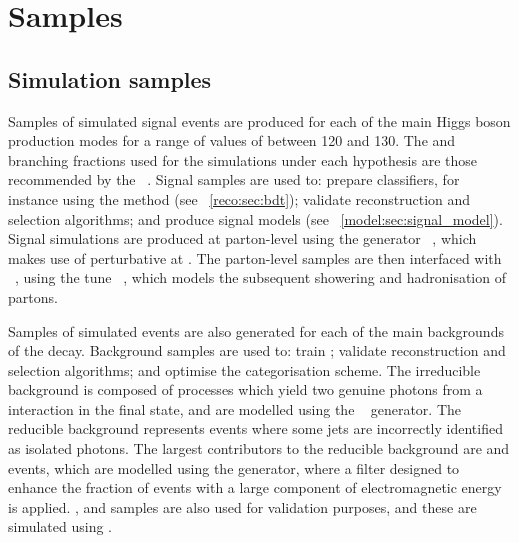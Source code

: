 






\section{Samples}
\label{reco:sec:samples}
\subsection{Simulation samples}

Samples of simulated signal events are produced for each of the main Higgs boson production modes for a range of values of \mH between 120 and 130\GeV. The \crosssection and branching fractions used for the simulations under each \mH hypothesis are those recommended by the \LHCHXSWG~\cite{LHCHXSWGYR4}. Signal samples are used to: prepare classifiers, for instance using the \BDT method (see \Sec~\ref{reco:sec:bdt}); validate reconstruction and selection algorithms; and produce signal models (see \Sec~\ref{model:sec:signal_model}). Signal simulations are produced at parton-level using the generator \Madgraph~\cite{Madgraph}, which makes use of perturbative \QCD at \NLO. The parton-level samples are then interfaced with \Pythia~\cite{Pythia8}, using the tune \PythiaTune~\cite{PythiaTune}, which models the subsequent showering and hadronisation of partons. 

Samples of simulated events are also generated for each of the main backgrounds of the \Hgg decay. Background samples are used to: train \BDT\s; validate reconstruction and selection algorithms; and optimise the categorisation scheme. The irreducible background is composed of \SM processes which yield two genuine photons from a \pp interaction in the final state, and are modelled using the \Sherpa~\cite{Sherpa} generator. The reducible background represents events where some jets are incorrectly identified as isolated photons. The largest contributors to the reducible background are \gammaJet and \QCDmultijet events, which are modelled using the \Pythia generator, where a filter designed to enhance the fraction of events with a large component of electromagnetic energy is applied. %
\DY, \Wg and \Zg samples are also used for validation purposes, and these are simulated using \Madgraph. 

